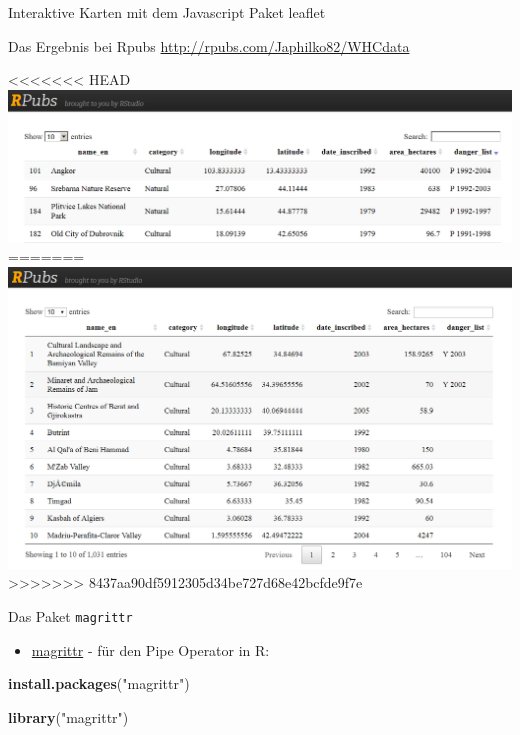 \documentclass[ignorenonframetext,]{beamer}
\newenvironment{Shaded}{}{}
\newcommand{\KeywordTok}[1]{\textcolor[rgb]{0.00,0.44,0.13}{\textbf{{#1}}}}
\newcommand{\StringTok}[1]{\textcolor[rgb]{0.25,0.44,0.63}{{#1}}}
\newcommand{\NormalTok}[1]{{#1}}
\providecommand{\tightlist}{%
\setlength{\itemsep}{0pt}\setlength{\parskip}{0pt}}
\begin{document}
\begin{frame}[fragile]{Interaktive Karten mit dem Javascript Paket
leaflet}
\begin{block}{Das Ergebnis bei Rpubs}
\url{http://rpubs.com/Japhilko82/WHCdata}

\textless{}\textless{}\textless{}\textless{}\textless{}\textless{}\textless{}
HEAD
\includegraphics{./tex2pdf.9796/01040098b8f6032936421c020a37ff8b059045d6.png}
======= \includegraphics{../figure/WHCRpubs.PNG}
\textgreater{}\textgreater{}\textgreater{}\textgreater{}\textgreater{}\textgreater{}\textgreater{}
8437aa90df5912305d34be727d68e42bcfde9f7e

\end{block}

\begin{block}{Das Paket \texttt{magrittr}}

\begin{itemize}
\tightlist
\item
  \href{https://cran.r-project.org/web/packages/magrittr/index.html}{magrittr}
  - für den Pipe Operator in R:
\end{itemize}

\begin{Shaded}
\begin{Highlighting}[]
\KeywordTok{install.packages}\NormalTok{(}\StringTok{"magrittr"}\NormalTok{)}
\end{Highlighting}
\end{Shaded}

\begin{Shaded}
\begin{Highlighting}[]
\KeywordTok{library}\NormalTok{(}\StringTok{"magrittr"}\NormalTok{)}
\end{Highlighting}
\end{Shaded}


\end{block}
\end{frame}
\end{document}

